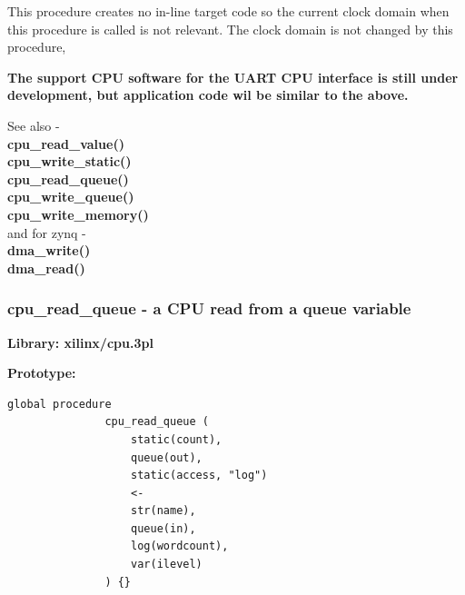             This procedure creates no in-line target code so the current clock domain
            when this procedure is called is not relevant. The clock domain is not
            changed by this procedure,
            
            {\bf The support CPU software for the UART CPU interface is still
            under development, but application code wil be similar to the
            above.}

            See also - \\
            {\bf cpu\_read\_value()}  \\
            {\bf cpu\_write\_static()}  \\
            {\bf cpu\_read\_queue()}  \\
            {\bf cpu\_write\_queue()}  \\
            {\bf cpu\_write\_memory()}  \\
            and for zynq -\\
            {\bf dma\_write()}  \\
            {\bf dma\_read()}  \\



            

            
                





        \subsubsection{cpu\_read\_queue - a CPU read from a queue
                                        variable}\label{sec:lpcpurdqueue}

            {\bf Library: xilinx/cpu.3pl}

            {\bf Prototype:} \\
            \vsp
            \begin{lstlisting}[gobble=12, language=threepl]
               global procedure
               cpu_read_queue (
                   static(count),
                   queue(out),
                   static(access, "log")
                   <-
                   str(name),
                   queue(in),
                   log(wordcount),
                   var(ilevel)
               ) {}
            \end{lstlisting}

